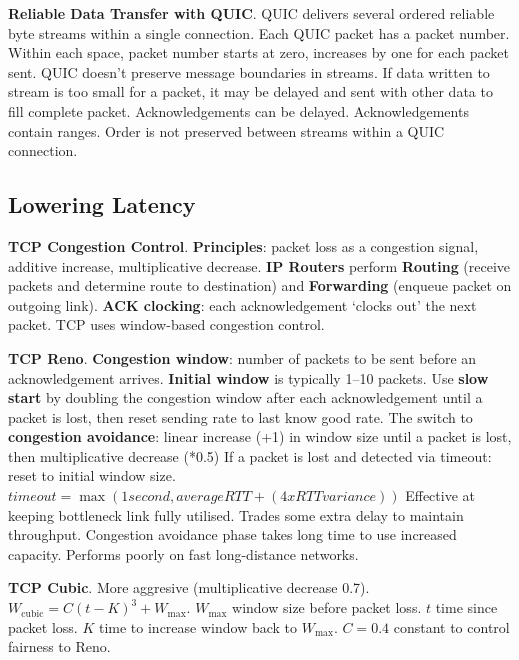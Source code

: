 \documentclass{article}
\begin{document}
\vspace{\baselineskip}
\textbf{Reliable Data Transfer with QUIC}.
QUIC delivers several ordered reliable byte streams within a single connection.
Each QUIC packet has a packet number.
Within each space, packet number starts at zero, increases by one for each packet sent.
QUIC doesn’t preserve message boundaries in streams.
If data written to stream is too small for a packet, it may be
delayed and sent with other data to fill complete packet.
Acknowledgements can be delayed.
Acknowledgements contain ranges.
Order is not preserved between streams within a QUIC connection.

\clearpage

\subsection*{Lowering Latency}

\textbf{TCP Congestion Control}.
\textbf{Principles}: packet loss as a congestion signal, additive increase, multiplicative decrease.
\textbf{IP Routers} perform \textbf{Routing} (receive packets and determine route to destination) and
\textbf{Forwarding} (enqueue packet on outgoing link).
\textbf{ACK clocking}: each acknowledgement `clocks out' the next packet.
TCP uses window-based congestion control.

\vspace{\baselineskip}
\textbf{TCP Reno}.
\textbf{Congestion window}: number of packets to be sent before an acknowledgement arrives.
\textbf{Initial window} is typically 1--10 packets.
Use \textbf{slow start} by doubling the congestion window after each acknowledgement until a packet is lost,
then reset sending rate to last know good rate.
The switch to \textbf{congestion avoidance}: linear increase (+1) in window size until a packet is lost, then multiplicative decrease (*0.5)
If a packet is lost and detected via timeout: reset to initial window size.
$timeout = \max(1 second, average RTT + (4 x RTT variance))$
Effective at keeping bottleneck link fully utilised.
Trades some extra delay to maintain throughput.
Congestion avoidance phase takes long time to use increased capacity.
Performs poorly on fast long-distance networks.

\vspace{\baselineskip}
\textbf{TCP Cubic}.
More aggresive (multiplicative decrease 0.7).
$W_{\text{cubic}} = C {(t - K)}^3 + W_{\text{max}}$.
$W_{\text{max}}$ window size before packet loss.
$t$ time since packet loss.
$K$ time to increase window back to $W_{\text{max}}$.
$C = 0.4$ constant to control fairness to Reno.
\end{document}
